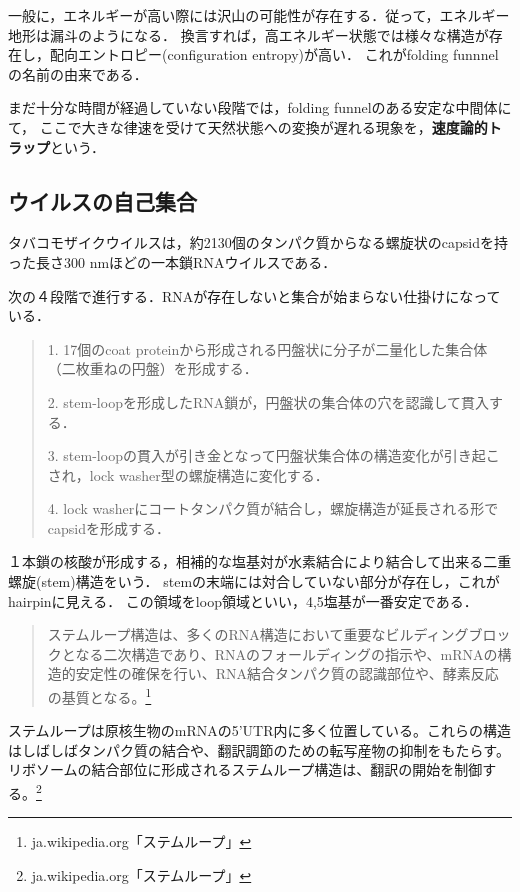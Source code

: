 \documentclass[uplatex, dvipdfmx]{jsreport}
\begin{document}
一般に，エネルギーが高い際には沢山の可能性が存在する．従って，エネルギー地形は漏斗のようになる．
換言すれば，高エネルギー状態では様々な構造が存在し，配向エントロピー(configuration entropy)が高い．
これがfolding funnnelの名前の由来である．

\begin{definition}
    まだ十分な時間が経過していない段階では，folding funnelのある安定な中間体にて，
    ここで大きな律速を受けて天然状態への変換が遅れる現象を，\textbf{速度論的トラップ}という．
\end{definition}

\subsection{ウイルスの自己集合}

\begin{definition}[TMV]\label{def-TMV}
    タバコモザイクウイルスは，約2130個のタンパク質からなる螺旋状のcapsidを持った長さ300 nmほどの一本鎖RNAウイルスである．
\end{definition}
\begin{example}[TMVの自己集合]
    次の４段階で進行する．RNAが存在しないと集合が始まらない仕掛けになっている．
    \begin{quotation}
        1. 17個のcoat proteinから形成される円盤状に分子が二量化した集合体（二枚重ねの円盤）を形成する．

        2. stem-loopを形成したRNA鎖が，円盤状の集合体の穴を認識して貫入する．

        3. stem-loopの貫入が引き金となって円盤状集合体の構造変化が引き起こされ，lock washer型の螺旋構造に変化する．

        4. lock washerにコートタンパク質が結合し，螺旋構造が延長される形でcapsidを形成する．
    \end{quotation}
\end{example}
\begin{definition}
    １本鎖の核酸が形成する，相補的な塩基対が水素結合により結合して出来る二重螺旋(stem)構造をいう．
    stemの末端には対合していない部分が存在し，これがhairpinに見える．
    この領域をloop領域といい，4,5塩基が一番安定である．
    \begin{quote}
        ステムループ構造は、多くのRNA構造において重要なビルディングブロックとなる二次構造であり、RNAのフォールディングの指示や、mRNAの構造的安定性の確保を行い、RNA結合タンパク質の認識部位や、酵素反応の基質となる。\footnote{ja.wikipedia.org「ステムループ」}
    \end{quote}
\end{definition}
\begin{remark}[細胞内での機能]
    ステムループは原核生物のmRNAの5'UTR内に多く位置している。これらの構造はしばしばタンパク質の結合や、翻訳調節のための転写産物の抑制をもたらす。リボソームの結合部位に形成されるステムループ構造は、翻訳の開始を制御する。\footnote{ja.wikipedia.org「ステムループ」}
\end{remark}
\end{document}
